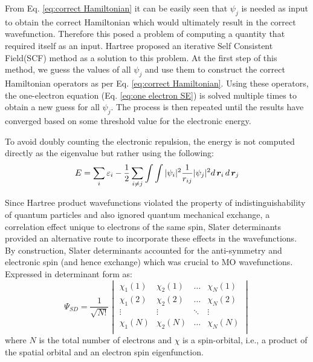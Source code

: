             From Eq. \eqref{eq:correct Hamiltonian} it can be easily seen that $\psi_j$ is needed as input to obtain the correct Hamiltonian which would ultimately result in the correct wavefunction. Therefore this posed a problem of computing a quantity that required itself as an input. Hartree proposed an iterative Self Consistent Field(SCF) method as a solution to this problem. At the first step of this method, we guess the values of all $\psi_j$ and use them to construct the correct Hamiltonian operators as per Eq. \eqref{eq:correct Hamiltonian}. Using these operators, the one-electron \Schrodinger{} equation (Eq. \eqref{eq:one electron SE}) is solved multiple times to obtain a new guess for all $\psi_j$. The process is then repeated until the results have converged based on some threshold value for the electronic energy.

            To avoid doubly counting the electronic repulsion, the energy is not computed directly as the eigenvalue but rather using the following:
            \begin{equation}\label{eq:Hartree Hamiltonian energy}
                E = \displaystyle\sum_i \varepsilon_i - \frac{1}{2} \sum_{i \ne j} \int \int |\psi_i|^2 \frac{1}{r_{ij}} |\psi_j|^2 d\,{\boldsymbol {r}}_i\, d\,{\boldsymbol {r}}_j
            \end{equation}

            Since Hartree product wavefunctions violated the property of indistinguishability of quantum particles and also ignored quantum mechanical exchange, a correlation effect unique to electrons of the same spin, Slater determinants provided an alternative route to incorporate these effects in the wavefunctions. By construction, Slater determinants accounted for the anti-symmetry and electronic spin (and hence exchange) which was crucial to MO wavefunctions. Expressed in determinant form as:
            \begin{equation}\label{eq:Slater determinant}
                \Psi_{SD} = \frac{1}{\sqrt{N!}}
                \begin{vmatrix}
                    \chi_1 (1) & \chi_2 (1) & \ldots & \chi_N (1)\\
                    \chi_1 (2) & \chi_2 (2) & \ldots & \chi_N (2)\\
                    \vdots & \vdots & \ddots & \vdots\\
                    \chi_1 (N) & \chi_2 (N) & \ldots & \chi_N (N)\\
                \end{vmatrix}
            \end{equation}
            where $N$ is the total number of electrons and $\chi$ is a spin-orbital, i.e., a product of the spatial orbital and an electron spin eigenfunction.

